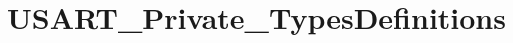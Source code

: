 \hypertarget{group___u_s_a_r_t___private___types_definitions}{}\section{U\+S\+A\+R\+T\+\_\+\+Private\+\_\+\+Types\+Definitions}
\label{group___u_s_a_r_t___private___types_definitions}
